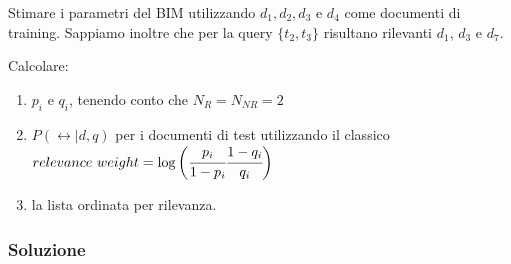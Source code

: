 Stimare i parametri del BIM utilizzando $d_1,d_2, d_3$ e $d_4$ come documenti di training. Sappiamo inoltre che per la query $\{t_2, t_3\}$ risultano rilevanti $d_1$, $d_3$ e $d_7$.

Calcolare:

\begin{enumerate}
	\item $p_i$ e $q_i$, tenendo conto che $N_R = N_{NR} = 2$
	\item $P(\rel | d,q)$ per i documenti di test utilizzando il classico $relevance \ weight = \log\bigg(\cfrac{p_i}{1-p_i} \cfrac{1- q_i}{q_i}\bigg)$
	\item la lista ordinata per rilevanza.
\end{enumerate}

\subsubsection{Soluzione}




